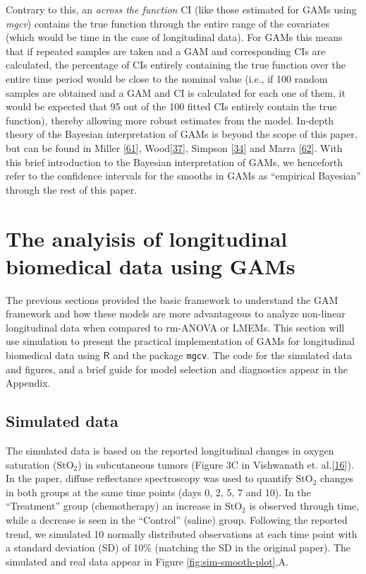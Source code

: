 \documentclass[
]{article}
\newcommand{\passthrough}[1]{#1}
\begin{document}
Contrary to this, an \emph{across the function} CI (like those estimated for GAMs using \emph{mgcv}) contains the true function through the entire range of the covariates (which would be time in the case of longitudinal data). For GAMs this means that if repeated samples are taken and a GAM and corresponding CIs are calculated, the percentage of CIs entirely containing the true function over the entire time period would be close to the nominal value (i.e., if 100 random samples are obtained and a GAM and CI is calculated for each one of them, it would be expected that 95 out of the 100 fitted CIs entirely contain the true function), thereby allowing more robust estimates from the model. In-depth theory of the Bayesian interpretation of GAMs is beyond the scope of this paper, but can be found in Miller {[}\protect\hyperlink{ref-miller2019}{61}{]}, Wood{[}\protect\hyperlink{ref-wood2017}{37}{]}, Simpson {[}\protect\hyperlink{ref-simpson2018}{34}{]} and Marra {[}\protect\hyperlink{ref-marra2012}{62}{]}. With this brief introduction to the Bayesian interpretation of GAMs, we henceforth refer to the confidence intervals for the smooths in GAMs as ``empirical Bayesian'' through the rest of this paper.

\hypertarget{longitudinal-GAMs}{%
\section{The analyisis of longitudinal biomedical data using GAMs}\label{longitudinal-GAMs}}

The previous sections provided the basic framework to understand the GAM framework and how these models are more advantageous to analyze non-linear longitudinal data when compared to rm-ANOVA or LMEMs. This section will use simulation to present the practical implementation of GAMs for longitudinal biomedical data using \(\textsf{R}\) and the package \passthrough{\lstinline!mgcv!}. The code for the simulated data and figures, and a brief guide for model selection and diagnostics appear in the Appendix.

\hypertarget{simulated-data}{%
\subsection{Simulated data}\label{simulated-data}}

The simulated data is based on the reported longitudinal changes in oxygen saturation (\(\mbox{StO}_2\)) in subcutaneous tumors (Figure 3C in Vishwanath et. al.{[}\protect\hyperlink{ref-vishwanath2009}{16}{]}). In the paper, diffuse reflectance spectroscopy was used to quantify \(\mbox{StO}_2\) changes in both groups at the same time points (days 0, 2, 5, 7 and 10). In the ``Treatment'' group (chemotherapy) an increase in \(\mbox{StO}_2\) is observed through time, while a decrease is seen in the ``Control'' (saline) group. Following the reported trend, we simulated 10 normally distributed observations at each time point with a standard deviation (SD) of 10\% (matching the SD in the original paper).
The simulated and real data appear in Figure \ref{fig:sim-smooth-plot},A.
\end{document}
